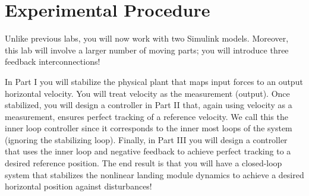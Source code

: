 \section{Experimental Procedure}\label{Lab:3:Experiment}
Unlike previous labs, you will now work with two Simulink models.
Moreover, this lab will involve a larger number of moving parts;
you will introduce three feedback interconnections!

In Part I you will stabilize the physical plant that maps input forces to an output horizontal velocity.
You will treat velocity as the measurement (output).
Once stabilized, you will design a controller in Part II that, again using velocity as a measurement, ensures perfect tracking of a reference velocity.
We call this the inner loop controller since it corresponds to the inner most loops of the system (ignoring the stabilizing loop).
Finally, in Part III you will design a controller that uses the inner loop and negative feedback to achieve perfect tracking to a desired reference position.
The end result is that you will have a closed-loop system that stabilizes the nonlinear landing module dynamics to achieve a desired horizontal position against disturbances!

